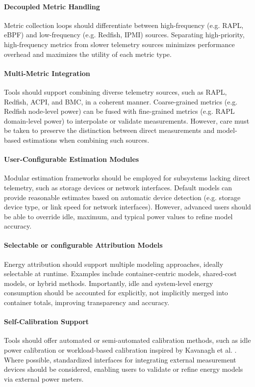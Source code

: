 \paragraph{Decoupled Metric Handling}
Metric collection loops should differentiate between high-frequency (e.g. RAPL, eBPF) and low-frequency (e.g. Redfish, IPMI) sources. Separating high-priority, high-frequency metrics from slower telemetry sources minimizes performance overhead and maximizes the utility of each metric type.

\paragraph{Multi-Metric Integration}
Tools should support combining diverse telemetry sources, such as RAPL, Redfish, ACPI, and BMC, in a coherent manner. Coarse-grained metrics (e.g. Redfish node-level power) can be fused with fine-grained metrics (e.g. RAPL domain-level power) to interpolate or validate measurements. However, care must be taken to preserve the distinction between direct measurements and model-based estimations when combining such sources.

\paragraph{User-Configurable Estimation Modules}
Modular estimation frameworks should be employed for subsystems lacking direct telemetry, such as storage devices or network interfaces. Default models can provide reasonable estimates based on automatic device detection (e.g. storage device type, or link speed for network interfaces). However, advanced users should be able to override idle, maximum, and typical power values to refine model accuracy.

\paragraph{Selectable or configurable Attribution Models}
Energy attribution should support multiple modeling approaches, ideally selectable at runtime. Examples include container-centric models, shared-cost models, or hybrid methods. Importantly, idle and system-level energy consumption should be accounted for explicitly, not implicitly merged into container totals, improving transparency and accuracy.

\paragraph{Self-Calibration Support}
Tools should offer automated or semi-automated calibration methods, such as idle power calibration or workload-based calibration inspired by Kavanagh et al. \parencite{kavanagh2019rapid}. Where possible, standardized interfaces for integrating external measurement devices should be considered, enabling users to validate or refine energy models via external power meters.

